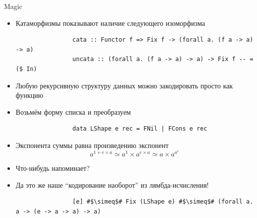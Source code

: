    \begin{frame}[fragile]{Magic \advancedslide}
        \begin{itemize}
            \item Катаморфизмы показывают наличие следующего изоморфизма
            \begin{verbatim}
                cata :: Functor f => Fix f -> (forall a. (f a -> a) -> a)
                uncata :: (forall a. (f a -> a) -> a) -> Fix f -- = ($ In)
            \end{verbatim}
            \item[\then] Любую рекурсивную структуру данных можно закодировать просто как функцию
            \item Возьмём форму списка и преобразуем
            \begin{verbatim}
                data LShape e rec = FNil | FCons e rec
            \end{verbatim}
            \item[\then] Экспонента суммы равна произведению экспонент \[a^{1 + e\times a} \simeq a^1\times a^{e\times a} \simeq a\times a^{a^e}\]
            \item[\todo] Что-нибудь напоминает?
            \item[\answer] \pause Да это же наше ``кодирование наоборот'' из лямбда-исчисления!
            \begin{verbatim}
                [e] #$\simeq$# Fix (LShape e) #$\simeq$# (forall a. a -> (e -> a -> a) -> a)
            \end{verbatim}
        \end{itemize}
    \end{frame}


